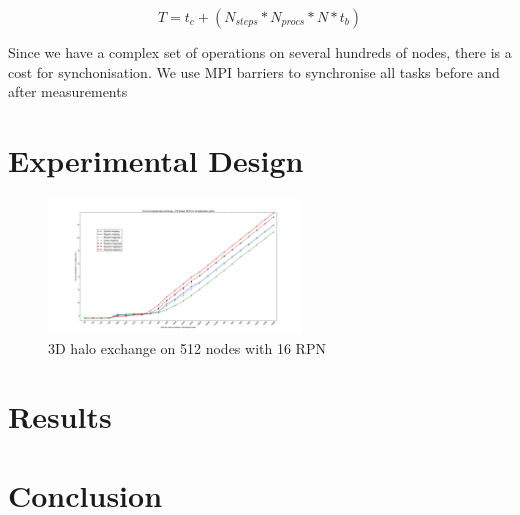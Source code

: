 \documentclass[conference,10pt]{IEEEtran}
\begin{document}
\begin{equation}
  T = t_c + (N_{steps} * N_{procs} * N * t_b)
\end{equation}

Since we have a complex set of operations on several hundreds of nodes, there is a cost for synchonisation.
We use MPI barriers to synchronise all tasks before and after measurements

\section{Experimental Design}

\label{sect:3D Halo plot}
\begin{figure}
  \center
  \includegraphics[width=0.6\textwidth]{3D_512_all_mappings.png}
  \caption{3D halo exchange on 512 nodes with 16 RPN}
    \label{fig:3D halo exchange on 512 nodes with 16 RPN}
\end{figure}


\section{Results}

\section{Conclusion}




\end{document}
